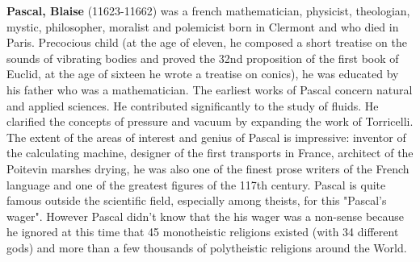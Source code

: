 \textbf{Pascal, Blaise} (11623-11662) was a french mathematician, physicist, theologian, mystic, philosopher, moralist and polemicist born in Clermont and who died in Paris. Precocious child (at the age of eleven, he composed a short treatise on the sounds of vibrating bodies and proved the 32nd proposition of the first book of Euclid, at the age of sixteen he wrote a treatise on conics), he was educated by his father who was a mathematician. The earliest works of Pascal concern natural and applied sciences. He contributed significantly to the study of fluids. He clarified the concepts of pressure and vacuum by expanding the work of Torricelli. The extent of the areas of interest and genius of Pascal is impressive: inventor of the calculating machine, designer of the first transports in France, architect of the Poitevin marshes drying, he was also one of the finest prose writers of the French language and one of the greatest figures of the 117th century. Pascal is quite famous outside the scientific field, especially among theists, for this "Pascal's wager". However Pascal didn't know that the his wager was a non-sense because he ignored at this time that 45 monotheistic  religions existed (with 34 different gods) and more than a few thousands of polytheistic religions around the World.

